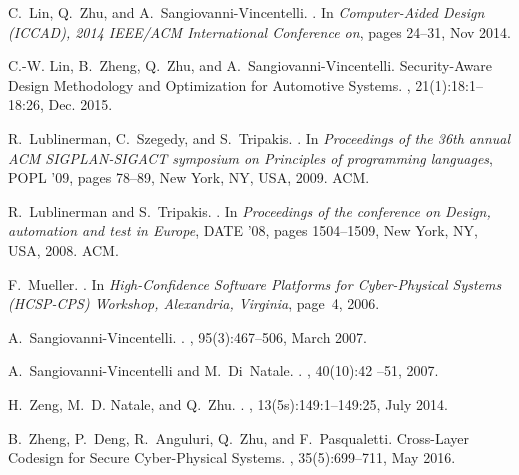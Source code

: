 \begin{thebibliography}{10}
C.~Lin, Q.~Zhu, and A.~Sangiovanni-Vincentelli.
.
\newblock In {\em Computer-Aided Design (ICCAD), 2014 IEEE/ACM International
  Conference on}, pages 24--31, Nov 2014.

C.-W. Lin, B.~Zheng, Q.~Zhu, and A.~Sangiovanni-Vincentelli.
\newblock Security-Aware Design Methodology and Optimization for Automotive
  Systems.
, 21(1):18:1--18:26, Dec.
  2015.

R.~Lublinerman, C.~Szegedy, and S.~Tripakis.
.
\newblock In {\em Proceedings of the 36th annual ACM SIGPLAN-SIGACT symposium
  on Principles of programming languages}, POPL '09, pages 78--89, New York,
  NY, USA, 2009. ACM.

R.~Lublinerman and S.~Tripakis.
.
\newblock In {\em Proceedings of the conference on Design, automation and test
  in Europe}, DATE '08, pages 1504--1509, New York, NY, USA, 2008. ACM.

F.~Mueller.
.
\newblock In {\em High-Confidence Software Platforms for Cyber-Physical Systems
  (HCSP-CPS) Workshop, Alexandria, Virginia}, page~4, 2006.

A.~Sangiovanni-Vincentelli.
.
, 95(3):467--506, March 2007.

A.~Sangiovanni-Vincentelli and M.~Di~Natale.
.
, 40(10):42 --51, 2007.

H.~Zeng, M.~D. Natale, and Q.~Zhu.
.
, 13(5s):149:1--149:25, July
  2014.

B.~Zheng, P.~Deng, R.~Anguluri, Q.~Zhu, and F.~Pasqualetti.
\newblock Cross-Layer Codesign for Secure Cyber-Physical Systems.
, 35(5):699--711, May 2016.


\end{thebibliography}
